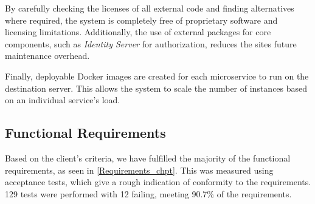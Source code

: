   \par
  By carefully checking the licenses of all external code and finding alternatives where required, the system is completely free of proprietary software and licensing limitations. Additionally, the use of external packages for core components, such as \textit{Identity Server} for authorization, reduces the sites future maintenance overhead.

  \par
  Finally, deployable Docker images are created for each microservice to run on the destination server. This allows the system to scale the number of instances based on an individual service's load.

  \subsection{Functional Requirements}
  \par
  Based on the client's criteria, we have fulfilled the majority of the functional requirements, as seen in \ref{Requirements_chpt}. This was measured using acceptance tests, which give a rough indication of conformity to the requirements. 129 tests were performed with 12 failing, meeting 90.7\% of the requirements.
